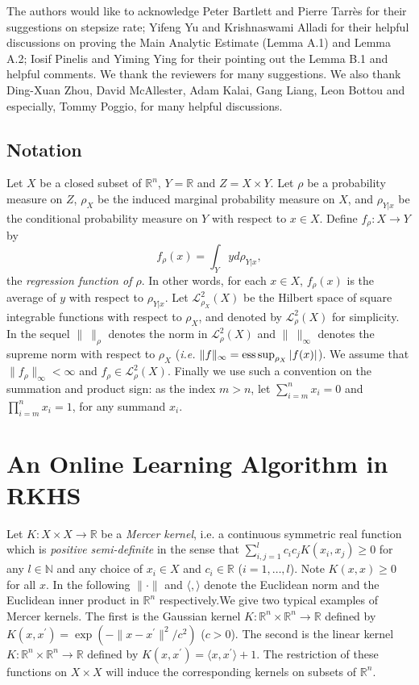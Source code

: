 \documentclass[twoside]{amsart}
\theoremstyle{theorem}
\theoremstyle{definition}
\theoremstyle{remark}
\def\L{{\mathscr L}}
\def\N{{\mathbb N}}
\def\ess{{\rm ess}}
\def\R{{\mathbb R}}        %
\def\L{{\mathscr L}}     %
\def\<{{\langle}}
\def\>{{\rangle}}
\begin{document}
The authors would like to acknowledge Peter Bartlett and Pierre Tarr\`es for their suggestions on stepsize rate; Yifeng Yu and
Krishnaswami Alladi for their helpful discussions on proving the Main Analytic Estimate (Lemma A.1) and Lemma A.2; Iosif Pinelis and
Yiming Ying for their pointing out the Lemma B.1 and helpful comments. We thank the reviewers for many suggestions.
We also thank Ding-Xuan Zhou, David McAllester, Adam Kalai, Gang Liang, Leon Bottou
and especially, Tommy Poggio, for many helpful discussions.

\subsection{Notation}
Let $X$ be a closed subset of $\R^n$, $Y=\R$ and $Z=X\times Y$.
Let $\rho$ be a probability measure on $Z$, $\rho_{X}$ be the induced marginal probability measure on $X$,
and $\rho_{Y|x}$ be the conditional probability measure on $Y$ with respect to $x\in
X$. Define $f_\rho:X\to Y$ by
\[ f_\rho (x) = \int_Y y d \rho_{Y|x}, \]
the \emph{regression function of $\rho$}. In other words, for each
$x\in X$, $f_\rho(x)$ is the average of $y$ with respect to
$\rho_{Y|x}$. Let $\L^2_{\rho_X}(X)$ be the Hilbert space of
square integrable functions with respect to $\rho_X$, and denoted
by $\L^2_\rho(X)$ for simplicity. In the sequel $\|\ \|_\rho$
denotes the norm in $\L^2_\rho(X)$ and $\|\ \|_\infty$ denotes the
supreme norm with respect to $\rho_X$ (\emph{i.e.}
$\|f\|_\infty=\ess\sup_{\rho_X} |f(x)|$). We assume that
$\|f_\rho\|_\infty <\infty$ and $f_\rho \in \L^2_{\rho}(X)$. Finally we
use such a convention on the summation and product sign: as
the index $m>n$, let $\sum_{i=m}^n x_i =0$ and $\prod_{i=m}^n x_i=1$, for any summand $x_i$.

\section{An Online Learning Algorithm in RKHS}

Let $K:X\times X\to \R$ be a \emph{Mercer kernel}, i.e. a
continuous symmetric real function which is \emph{positive
semi-definite} in the sense that $\sum_{i,j=1}^l c_i c_j K(x_i,
x_j)\geq 0$ for any $l\in \N$ and any choice of $x_i\in X$ and
$c_i \in \R$ ($i=1,\ldots,l$). Note $K(x,x)\geq 0$ for all $x$. In
the following $\|\cdot \|$ and $\<,\>$ denote the Euclidean norm
and the Euclidean inner product in $\R^n$ respectively.We give two
typical examples of Mercer kernels. The first is the Gaussian
kernel $K:\R^n\times \R^n\to \R$ defined by $K(x,x^\prime)=
\exp(-\|x-x^\prime\|^2/c^2)$ ($c>0$). The second is the linear
kernel $K:\R^n\times \R^n\to \R$ defined by
$K(x,x^\prime)=\<x,x^\prime\>+1$. The restriction of these
functions on $X\times X$ will induce the corresponding kernels on
subsets of $\R^n$.
\end{document}
